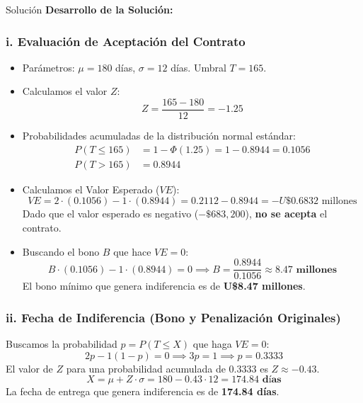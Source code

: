 \documentclass[11pt, a4paper]{article}
\begin{document}
  \medskip
  \begin{ejercicio}{Solución}
  \textbf{Desarrollo de la Solución:}

  \subsubsection*{i. Evaluación de Aceptación del Contrato}
  \begin{itemize}
    \item Parámetros: $\mu = 180$ días, $\sigma = 12$ días. Umbral $T = 165$.
    \item Calculamos el valor $Z$:
      \begin{equation*}
        Z = \frac{165 - 180}{12} = -1.25
      \end{equation*}
    \item Probabilidades acumuladas de la distribución normal estándar:
      \begin{align*}
        P(T \le 165) &= 1 - \Phi(1.25) = 1 - 0.8944 = 0.1056 \\
        P(T > 165) &= 0.8944
      \end{align*}
    \item Calculamos el Valor Esperado ($VE$):
      \begin{equation*}
        VE = 2 \cdot (0.1056) - 1 \cdot (0.8944) = 0.2112 - 0.8944 = -U\$0.6832 \text{ millones}
      \end{equation*}
      Dado que el valor esperado es negativo ($-\$683,200$), \textbf{no se acepta} el contrato.
    \item Buscando el bono $B$ que hace $VE = 0$:
      \begin{equation*}
        B \cdot (0.1056) - 1 \cdot (0.8944) = 0 \implies B = \frac{0.8944}{0.1056} \approx \mathbf{8.47 \text{ millones}}
      \end{equation*}
      El bono mínimo que genera indiferencia es de \textbf{U\$8.47 millones}.
  \end{itemize}

  \subsubsection*{ii. Fecha de Indiferencia (Bono y Penalización Originales)}
  Buscamos la probabilidad $p = P(T \le X)$ que haga $VE = 0$:
  \begin{equation*}
    2 p - 1(1 - p) = 0 \implies 3 p = 1 \implies p = 0.3333
  \end{equation*}
  El valor de $Z$ para una probabilidad acumulada de $0.3333$ es $Z \approx -0.43$.
  \begin{equation*}
    X = \mu + Z \cdot \sigma = 180 - 0.43 \cdot 12 = \mathbf{174.84 \text{ días}}
  \end{equation*}
  La fecha de entrega que genera indiferencia es de \textbf{174.84 días}.


\end{ejercicio}
\end{document}
